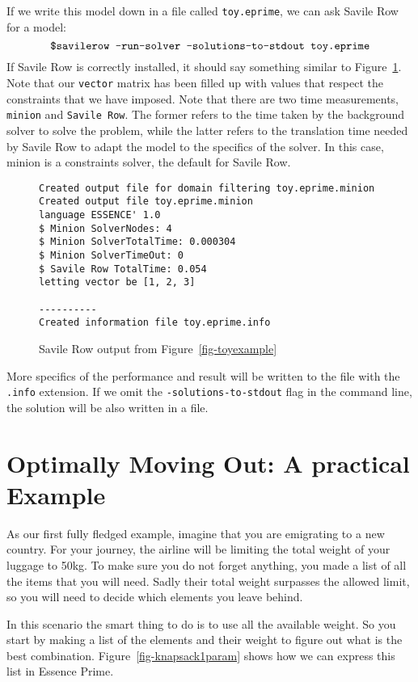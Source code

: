 If we write this model down in a file called \texttt{toy.eprime}, we can ask
Savile Row for a model:
$$\text{\texttt{\$savilerow -run-solver -solutions-to-stdout toy.eprime}}$$
If Savile Row is correctly installed, it should say something similar to
Figure~\ref{fig-output1}. Note that our \texttt{vector} matrix has been filled
up with values that respect the constraints that we have imposed. Note that
there are two time measurements, \texttt{minion} and \texttt{Savile Row}. The
former refers to the time taken by the background solver to solve the problem,
while the latter refers to the translation time needed by Savile Row to adapt
the model to the specifics of the solver. In this case, minion is a constraints
solver, the default for Savile Row.

\begin{figure}
\begin{lstlisting}
Created output file for domain filtering toy.eprime.minion
Created output file toy.eprime.minion
language ESSENCE' 1.0  
$ Minion SolverNodes: 4 
$ Minion SolverTotalTime: 0.000304 
$ Minion SolverTimeOut: 0   
$ Savile Row TotalTime: 0.054
letting vector be [1, 2, 3]

----------
Created information file toy.eprime.info
\end{lstlisting}
    \caption{Savile Row output from Figure~\ref{fig-toyexample}}
    \label{fig-output1}
\end{figure}

More specifics of the performance and result will be written to the file with
the \texttt{.info} extension. If we omit the \texttt{-solutions-to-stdout} flag
in the command line, the solution will be also written in a file.

\section{Optimally Moving Out: A practical Example}

As our first fully fledged example, imagine that you are emigrating to a new country. For
your journey, the airline will be limiting the total weight of your luggage to
50kg.  To make sure you do not forget anything, you made a list of all the
items that you will need. Sadly their total weight surpasses the allowed limit,
so you will need to decide which elements you leave behind.

In this scenario the smart thing to do is to use all the available weight. So
you start by making a list of the elements and their weight to figure out what
is the best combination. 
Figure~\ref{fig-knapsack1param} shows how we can express this list in Essence Prime.


